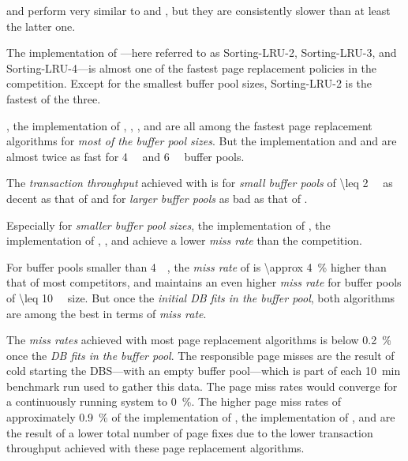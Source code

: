 
     and  perform very similar to  and , but they are consistently slower than at least the latter one.

    The  implementation of ---here referred to as Sorting-LRU-2, Sorting-LRU-3, and Sorting-LRU-4---is almost one of the fastest page replacement policies in the competition. Except for the smallest buffer pool sizes, Sorting-LRU-2 is the fastest of the three.

    , the  implementation of , , ,  and  are all among the fastest page replacement algorithms for \emph{most of the buffer pool sizes}. But the  implementation  and  and  are almost twice as fast for \SI{4}{\giga\byte} and \SI{6}{\giga\byte} buffer pools.

    The \emph{transaction throughput} achieved with  is for \emph{small buffer pools} of \SI{\leq 2}{\giga\byte} as decent as that of  and for \emph{larger buffer pools} as bad as that of .

    Especially for \emph{smaller buffer pool sizes}, the  implementation of , the  implementation of , ,  and  achieve a lower \emph{miss rate} than the competition.

    For buffer pools smaller than \SI{4}{\giga\byte}, the \emph{miss rate} of  is \SI{\approx 4}{\percent} higher than that of most competitors, and  maintains an even higher \emph{miss rate} for buffer pools of \SI{\leq 10}{\giga\byte} size. But once the \emph{initial DB fits in the buffer pool}, both algorithms are among the best in terms of \emph{miss rate}.

    The \emph{miss rates} achieved with most page replacement algorithms is below \SI{0.2}{\percent} once the \emph{DB fits in the buffer pool}. The responsible page misses are the result of cold starting the DBS---with an empty buffer pool---which is part of each \SI{10}{\minute} benchmark run used to gather this data. The page miss rates would converge for a continuously running system to \SI{0}{\percent}. The higher page miss rates of approximately \SI{0.9}{\percent} of the  implementation of , the  implementation of ,  and  are the result of a lower total number of page fixes due to the lower transaction throughput achieved with these page replacement algorithms.

